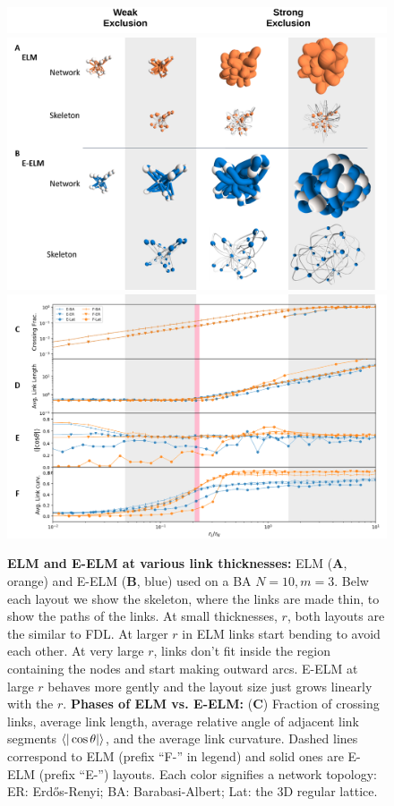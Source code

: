 \documentclass[nofootinbib,preprint,floatfix,titlepage,endfloats]{revtex4} %
\begin{document}
\begin{figure}
\centering
\vspace{2cm}
\includegraphics[width=.7\columnwidth]{fig-09-19/weak-strong.png}
\includegraphics[width=.7\columnwidth]{fig-09-19/phase-net-skl-3.png}
\includegraphics[width=.7\columnwidth]{fig-09-19/phase-cur-3.png}
\caption{%
         \scriptsize {\bf ELM and E-ELM at various link thicknesses:} ELM ({\bf A}, orange) and E-ELM ({\bf B}, blue) used on a BA $N=10, m=3$. Belw each layout we show the skeleton, where the links are made thin, to show the paths of the links.
         At small thicknesses, $r$, both layouts are the similar to FDL. At larger $r$ in ELM links start bending to avoid each other. At very large $r$, links don't fit inside the region containing the nodes and start making outward arcs. E-ELM at large $r$ behaves more gently and the layout size just grows linearly with the $r$.
         {\bf Phases of ELM vs. E-ELM:} ({\bf C})
         Fraction of crossing links, average link length, average relative angle of adjacent link segments $\be{|\cos\theta |}$, and the average link curvature. 
         Dashed lines correspond to ELM (prefix ``F-'' in legend) and solid ones are E-ELM (prefix ``E-'') layouts. Each color signifies a network topology: ER: Erdős-Renyi; BA: Barabasi-Albert; Lat: the 3D regular lattice. 
}
\end{figure}
\end{document}
